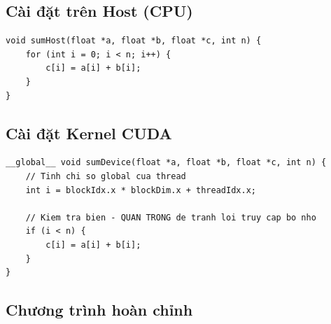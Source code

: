 \subsection{Cài đặt trên Host (CPU)}

\begin{lstlisting}[caption={Vector Sum tuần tự trên CPU}, label={lst:vector_sum_cpu}]
void sumHost(float *a, float *b, float *c, int n) {
    for (int i = 0; i < n; i++) {
        c[i] = a[i] + b[i];
    }
}
\end{lstlisting}

\subsection{Cài đặt Kernel CUDA}

\begin{lstlisting}[caption={Vector Sum Kernel trên GPU}, label={lst:vector_sum_gpu}]
__global__ void sumDevice(float *a, float *b, float *c, int n) {
    // Tinh chi so global cua thread
    int i = blockIdx.x * blockDim.x + threadIdx.x;
    
    // Kiem tra bien - QUAN TRONG de tranh loi truy cap bo nho
    if (i < n) {
        c[i] = a[i] + b[i];
    }
}
\end{lstlisting}

\subsection{Chương trình hoàn chỉnh}

